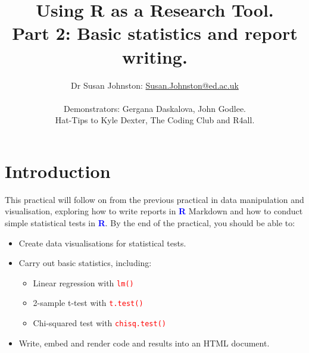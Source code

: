 \documentclass[a4paper,12pt]{article}
\newcommand\boldblue[1]{\textcolor{blue}{\textbf{#1}}}
\newcommand\code[1]{\textcolor{red}{\texttt{#1}}}
\begin{document}





\title{Using R as a Research Tool.\\
Part 2: Basic statistics and report writing.}
\author{Dr Susan Johnston: \href{mailto:Susan.Johnston@ed.ac.uk}{Susan.Johnston@ed.ac.uk}  \\ \\
        Demonstrators: Gergana Daskalova, John Godlee. \\
        Hat-Tips to Kyle Dexter, The Coding Club and R4all.}









\maketitle



\section {Introduction}

This practical will follow on from the previous practical in data manipulation and visualisation, exploring how to write reports in \boldblue{R} Markdown and how to conduct simple statistical tests in \boldblue{R}. By the end of the practical, you should be able to:

\begin{itemize}

\item Create data visualisations for statistical tests.
\item Carry out basic statistics, including:

\begin{itemize}

\item Linear regression with \code{lm()}
\item 2-sample t-test with \code{t.test()}
\item Chi-squared test with \code{chisq.test()}

\end{itemize}

\item Write, embed and render code and results into an HTML document.

\end{itemize}
\end{document}
